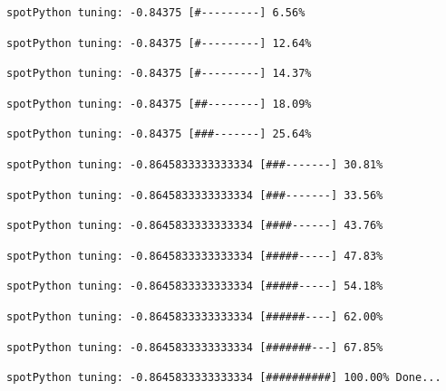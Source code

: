 \documentclass[
  letterpaper,
  DIV=11,
  numbers=noendperiod]{scrreprt}
\begin{document}
\begin{verbatim}
spotPython tuning: -0.84375 [#---------] 6.56% 
\end{verbatim}

\begin{verbatim}
spotPython tuning: -0.84375 [#---------] 12.64% 
\end{verbatim}

\begin{verbatim}
spotPython tuning: -0.84375 [#---------] 14.37% 
\end{verbatim}

\begin{verbatim}
spotPython tuning: -0.84375 [##--------] 18.09% 
\end{verbatim}

\begin{verbatim}
spotPython tuning: -0.84375 [###-------] 25.64% 
\end{verbatim}

\begin{verbatim}
spotPython tuning: -0.8645833333333334 [###-------] 30.81% 
\end{verbatim}

\begin{verbatim}
spotPython tuning: -0.8645833333333334 [###-------] 33.56% 
\end{verbatim}

\begin{verbatim}
spotPython tuning: -0.8645833333333334 [####------] 43.76% 
\end{verbatim}

\begin{verbatim}
spotPython tuning: -0.8645833333333334 [#####-----] 47.83% 
\end{verbatim}

\begin{verbatim}
spotPython tuning: -0.8645833333333334 [#####-----] 54.18% 
\end{verbatim}

\begin{verbatim}
spotPython tuning: -0.8645833333333334 [######----] 62.00% 
\end{verbatim}

\begin{verbatim}
spotPython tuning: -0.8645833333333334 [#######---] 67.85% 
\end{verbatim}

\begin{verbatim}
spotPython tuning: -0.8645833333333334 [##########] 100.00% Done...
\end{verbatim}
\end{document}
